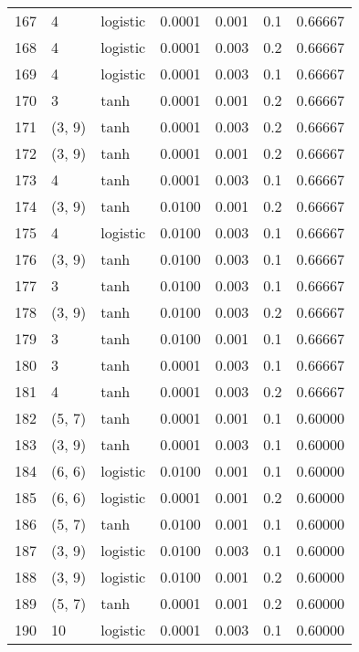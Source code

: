 \begin{tabular}{lllrrrr}
167 &           4 &  logistic &  0.0001 &  0.001 &  0.1 &   0.66667 \\
168 &           4 &  logistic &  0.0001 &  0.003 &  0.2 &   0.66667 \\
169 &           4 &  logistic &  0.0001 &  0.003 &  0.1 &   0.66667 \\
170 &           3 &      tanh &  0.0001 &  0.001 &  0.2 &   0.66667 \\
171 &      (3, 9) &      tanh &  0.0001 &  0.003 &  0.2 &   0.66667 \\
172 &      (3, 9) &      tanh &  0.0001 &  0.001 &  0.2 &   0.66667 \\
173 &           4 &      tanh &  0.0001 &  0.003 &  0.1 &   0.66667 \\
174 &      (3, 9) &      tanh &  0.0100 &  0.001 &  0.2 &   0.66667 \\
175 &           4 &  logistic &  0.0100 &  0.003 &  0.1 &   0.66667 \\
176 &      (3, 9) &      tanh &  0.0100 &  0.003 &  0.1 &   0.66667 \\
177 &           3 &      tanh &  0.0100 &  0.003 &  0.1 &   0.66667 \\
178 &      (3, 9) &      tanh &  0.0100 &  0.003 &  0.2 &   0.66667 \\
179 &           3 &      tanh &  0.0100 &  0.001 &  0.1 &   0.66667 \\
180 &           3 &      tanh &  0.0001 &  0.003 &  0.1 &   0.66667 \\
181 &           4 &      tanh &  0.0001 &  0.003 &  0.2 &   0.66667 \\
182 &      (5, 7) &      tanh &  0.0001 &  0.001 &  0.1 &   0.60000 \\
183 &      (3, 9) &      tanh &  0.0001 &  0.003 &  0.1 &   0.60000 \\
184 &      (6, 6) &  logistic &  0.0100 &  0.001 &  0.1 &   0.60000 \\
185 &      (6, 6) &  logistic &  0.0001 &  0.001 &  0.2 &   0.60000 \\
186 &      (5, 7) &      tanh &  0.0100 &  0.001 &  0.1 &   0.60000 \\
187 &      (3, 9) &  logistic &  0.0100 &  0.003 &  0.1 &   0.60000 \\
188 &      (3, 9) &  logistic &  0.0100 &  0.001 &  0.2 &   0.60000 \\
189 &      (5, 7) &      tanh &  0.0001 &  0.001 &  0.2 &   0.60000 \\
190 &          10 &  logistic &  0.0001 &  0.003 &  0.1 &   0.60000 \\

\end{tabular}

